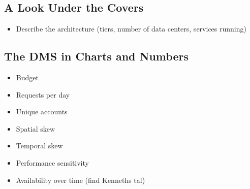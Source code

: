 \documentclass[11pt, oneside]{report}
\begin{document}
\subsection{A Look Under the Covers}
\begin{itemize}
\item Describe the architecture (tiers, number of data centers, services running)
\end{itemize}

\subsection{The DMS in Charts and Numbers}
\begin{itemize}
\item Budget
\item Requests per day
\item Unique accounts
\item Spatial skew
\item Temporal skew
\item Performance sensitivity
\item Availability over time (find Kenneths tal)
\end{itemize}
\end{document}
